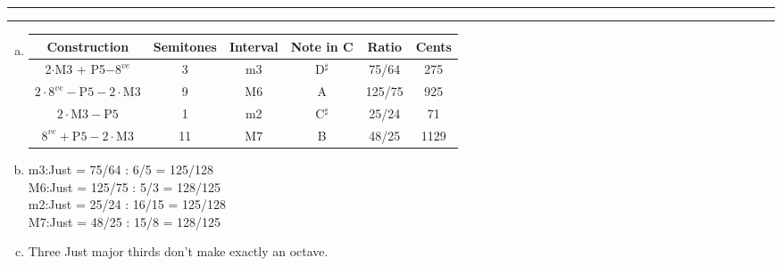 \documentclass[11pt]{article}
\newcounter{questionCounter}
\newcounter{partCounter}[questionCounter]
\newenvironment{question}[2][\arabic{questionCounter}]{%
    \setcounter{partCounter}{0}%
    \vspace{.25in} \hrule \vspace{0.5em}%
        \noindent{\bf #2}%
    \vspace{0.8em} \hrule \vspace{.10in}%
    \addtocounter{questionCounter}{1}%
}{}
\begin{document}
\begin{question}{Problem 6}
\begin{enumerate}[a)]
\item
\begin{center}
\begin{tabular}{c || c | c | c | c | c}
Construction & Semitones & Interval & Note in C & Ratio & Cents\\
\hline
2$\cdot$M3 + P5$- 8^{ve}$                  & 3  & m3 & D$^{\sharp}$ & 75/64  & 275 \\
$2\cdot 8^{ve}-\text{P}5-2\cdot \text{M}3$ & 9  & M6 & A            & 125/75 & 925 \\
$2\cdot \text{M}3 - \text{P}5$             & 1  & m2 & C$^{\sharp}$ & 25/24  & 71  \\
$8^{ve} + \text{P}5 - 2\cdot \text{M}3$    & 11 & M7 & B            & 48/25  & 1129\\
\end{tabular}
\end{center}
\item 
m3:Just =  75/64 : 6/5   = 125/128\\
M6:Just = 125/75 : 5/3   = 128/125\\
m2:Just =  25/24 : 16/15 = 125/128\\
M7:Just =  48/25 : 15/8  = 128/125\\
\item Three Just major thirds don't make exactly an octave.
\end{enumerate}
\end{question}
\end{document}
